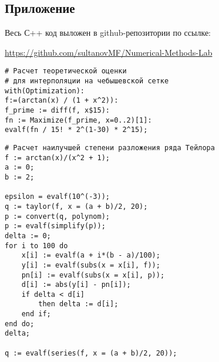 \documentclass[a4paper, fontsize=14pt]{article}
\begin{document}
\subsection*{Приложение}
Весь С++ код выложен в github-репозитории по ссылке: 

\url{https://github.com/sultanovMF/Numerical-Methods-Lab}

\begin{figure*}[h!]
    \begin{verbatim}
# Расчет теоретической оценки 
# для интерполяции на чебышевской сетке
with(Optimization):
f:=(arctan(x) / (1 + x^2)):
f_prime := diff(f, x$15):
fn := Maximize(f_prime, x=0..2)[1]:
evalf(fn / 15! * 2^(1-30) * 2^15);

    \end{verbatim}
\end{figure*}

\begin{figure*}[h!]
    \begin{verbatim}
# Расчет наилучшей степени разложения ряда Тейлора
f := arctan(x)/(x^2 + 1);
a := 0;
b := 2;

epsilon = evalf(10^(-3));
q := taylor(f, x = (a + b)/2, 20);
p := convert(q, polynom);
p := evalf(simplify(p));
delta := 0;
for i to 100 do 
    x[i] := evalf(a + i*(b - a)/100); 
    y[i] := evalf(subs(x = x[i], f)); 
    pn[i] := evalf(subs(x = x[i], p)); 
    d[i] := abs(y[i] - pn[i]);
    if delta < d[i]
        then delta := d[i]; 
    end if;
end do;
delta;

q := evalf(series(f, x = (a + b)/2, 20));
    \end{verbatim}
\end{figure*}
\end{document}
